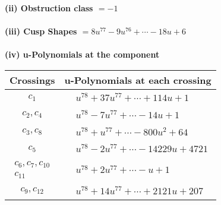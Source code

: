 \documentclass[1p]{elsarticle_modified}
\theoremstyle{definition}
\begin{document}
\flushleft \textbf{(ii) Obstruction class $= -1$}\\~\\
\flushleft \textbf{(iii) Cusp Shapes $= 8 u^{77}-9 u^{76}+\cdots-18 u+6$}\\~\\
\newpage\renewcommand{\arraystretch}{1}
\flushleft \textbf{(iv) u-Polynomials at the component}\newline \\
\begin{tabular}{m{50pt}|m{274pt}}
Crossings & \hspace{64pt}u-Polynomials at each crossing \\
\hline $$\begin{aligned}c_{1}\end{aligned}$$&$\begin{aligned}
&u^{78}+37 u^{77}+\cdots+114 u+1
\end{aligned}$\\
\hline $$\begin{aligned}c_{2},c_{4}\end{aligned}$$&$\begin{aligned}
&u^{78}-7 u^{77}+\cdots-14 u+1
\end{aligned}$\\
\hline $$\begin{aligned}c_{3},c_{8}\end{aligned}$$&$\begin{aligned}
&u^{78}+u^{77}+\cdots-800 u^2+64
\end{aligned}$\\
\hline $$\begin{aligned}c_{5}\end{aligned}$$&$\begin{aligned}
&u^{78}-2 u^{77}+\cdots-14229 u+4721
\end{aligned}$\\
\hline $$\begin{aligned}c_{6},c_{7},c_{10}\\c_{11}\end{aligned}$$&$\begin{aligned}
&u^{78}+2 u^{77}+\cdots- u+1
\end{aligned}$\\
\hline $$\begin{aligned}c_{9},c_{12}\end{aligned}$$&$\begin{aligned}
&u^{78}+14 u^{77}+\cdots+2121 u+207
\end{aligned}$\\
\hline
\end{tabular}\\~\\
\end{document}
